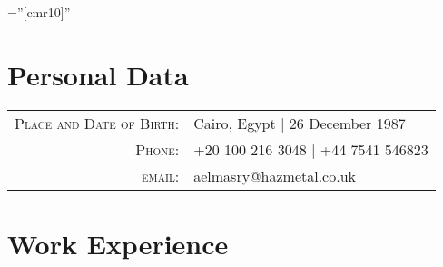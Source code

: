 \documentclass[a4paper,11pt]{article} %
\begin{document}
\pagestyle{empty} %

\font\fb=''[cmr10]'' %


\par{\bigskip\par} %

\vspace{-0.3cm}
\section{Personal Data}

\begin{tabular}{rl}
\textsc{Place and Date of Birth:} & Cairo, Egypt | 26 December 1987 \\
\textsc{Phone:} & +20 100 216 3048 | +44 7541 546823 \\
\textsc{email:} & \href{mailto:ayman-elmasry@hazeg.com}{aelmasry@hazmetal.co.uk}
\end{tabular}


\section{Work Experience}
\end{document}
